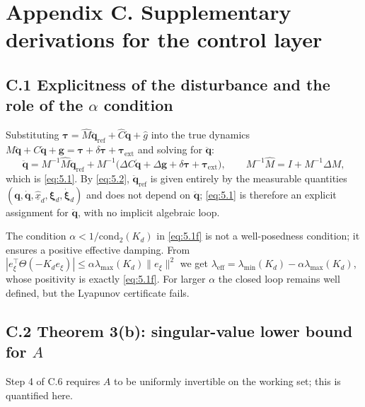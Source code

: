 \section*{Appendix C. Supplementary derivations for the control layer}

\subsection*{C.1 Explicitness of the disturbance and the role of the $\alpha$ condition}

Substituting $\boldsymbol\tau=\hat M\ddot{\boldsymbol q}_{\mathrm{ref}}+\hat C\dot{\boldsymbol q}+\hat g$ into the true dynamics $M\ddot{\boldsymbol q}+C\dot{\boldsymbol q}+\boldsymbol g=\boldsymbol\tau+\delta\boldsymbol\tau+\boldsymbol\tau_{\mathrm{ext}}$ and solving for $\ddot{\boldsymbol q}$:
\begin{equation*}
\ddot{\boldsymbol q}=M^{-1}\hat M\ddot{\boldsymbol q}_{\mathrm{ref}}+M^{-1}\bigl(\Delta C\dot{\boldsymbol q}+\Delta\boldsymbol g+\delta\boldsymbol\tau+\boldsymbol\tau_{\mathrm{ext}}\bigr),
\qquad M^{-1}\hat M=I+M^{-1}\Delta M ,
\end{equation*}
which is \eqref{eq:5.1}. By \eqref{eq:5.2}, $\ddot{\boldsymbol q}_{\mathrm{ref}}$ is given entirely by the measurable quantities $(\boldsymbol q,\dot{\boldsymbol q},\hat{\underline x}_d,\boldsymbol\xi_d,\dot{\boldsymbol\xi}_d)$ and does not depend on $\ddot{\boldsymbol q}$; \eqref{eq:5.1} is therefore an explicit assignment for $\ddot{\boldsymbol q}$, with no implicit algebraic loop.

The condition $\alpha<1/\mathrm{cond}_2(K_d)$ in \eqref{eq:5.1f} is not a well-posedness condition; it ensures a positive effective damping. From $|e_\xi^\top\Theta(-K_de_\xi)|\le\alpha\lambda_{\max}(K_d)\|e_\xi\|^2$ we get $\lambda_{\mathrm{eff}}=\lambda_{\min}(K_d)-\alpha\lambda_{\max}(K_d)$, whose positivity is exactly \eqref{eq:5.1f}. For larger $\alpha$ the closed loop remains well defined, but the Lyapunov certificate fails.

\subsection*{C.2 Theorem 3(b): singular-value lower bound for $A$}

Step 4 of C.6 requires $A$ to be uniformly invertible on the working set; this is quantified here.


